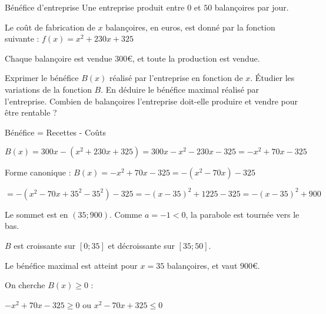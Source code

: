 \vspace{-4mm}

\vspace{-3mm}
\def\rdifficulty{2.5}
\begin{EXO}{Bénéfice d'entreprise}{}
Une entreprise produit entre $0$ et $50$ balançoires par jour.

Le coût de fabrication de $x$ balançoires, en euros, est donné par la fonction suivante : $f(x)=x^2+230x+325$

Chaque balançoire est vendue $300$\euro, et toute la production est vendue.

\begin{tcbenumerate}[2]
\tcbitem {} Exprimer le bénéfice $B(x)$ réalisé par l'entreprise en fonction de $x$.
\tcbitem {} Étudier les variations de la fonction $B$.
\tcbitem {} En déduire le bénéfice maximal réalisé par l'entreprise.
\tcbitem {} Combien de balançoires l'entreprise doit-elle produire et vendre pour être rentable ?
\end{tcbenumerate}

\exocorrection

\begin{tcbenumerate}[1]
\tcbitem Bénéfice = Recettes - Coûts

$B(x) = 300x - (x^2+230x+325) = 300x - x^2 - 230x - 325 = -x^2 + 70x - 325$

\tcbitem Forme canonique : $B(x) = -x^2 + 70x - 325 = -(x^2 - 70x) - 325$

$= -(x^2 - 70x + 35^2 - 35^2) - 325 = -(x-35)^2 + 1225 - 325 = -(x-35)^2 + 900$

Le sommet est en $(35; 900)$. Comme $a = -1 < 0$, la parabole est tournée vers le bas.

$B$ est croissante sur $[0;35]$ et décroissante sur $[35;50]$.

\tcbitem Le bénéfice maximal est atteint pour $x = 35$ balançoires, et vaut $900$\euro.

\tcbitem On cherche $B(x) \geq 0$ :

$-x^2 + 70x - 325 \geq 0$ ou $x^2 - 70x + 325 \leq 0$

\end{tcbenumerate}
\end{EXO}

